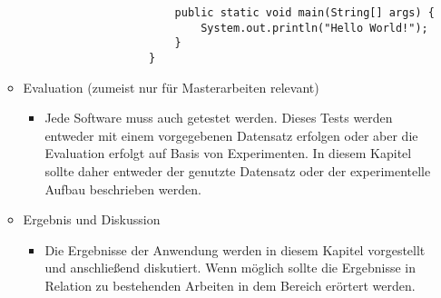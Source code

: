 \begin{itemize}
\begin{itemize}
\begin{itemize}
\begin{lstlisting}
					public static void main(String[] args) {
						System.out.println("Hello World!");
					}
				}
				\end{lstlisting} 
			\end{itemize}
		\item Evaluation (zumeist nur für Masterarbeiten relevant)
		\begin{itemize}
			\item Jede Software muss auch getestet werden. Dieses Tests werden entweder mit einem vorgegebenen Datensatz erfolgen oder aber die Evaluation erfolgt auf Basis von Experimenten. In diesem Kapitel sollte daher entweder der genutzte Datensatz oder der experimentelle Aufbau beschrieben werden. 
		\end{itemize}
		\item Ergebnis und Diskussion
		\begin{itemize}
			\item Die Ergebnisse der Anwendung werden in diesem Kapitel vorgestellt und anschließend diskutiert. Wenn möglich sollte die Ergebnisse in Relation zu bestehenden Arbeiten in dem Bereich erörtert werden.
		\end{itemize}
	\end{itemize}  
\end{itemize}